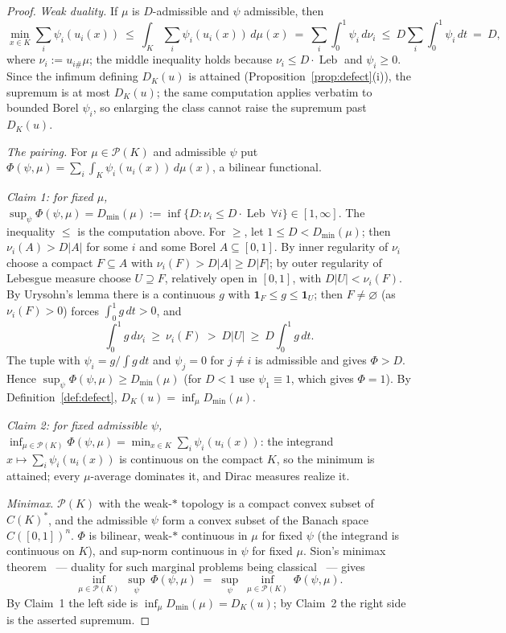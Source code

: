 \documentclass{aims}
\numberwithin{equation}{section}
\theoremstyle{plain}
\theoremstyle{definition}
\theoremstyle{remark}
\newcommand{\Leb}{\operatorname{Leb}}
\begin{document}
\begin{proof}
\emph{Weak duality.} If $\mu$ is $D$-admissible and $\psi$ admissible, then
\[
\min_{x\in K}\sum_i\psi_i(u_i(x))\ \le\
\int_K\sum_i\psi_i(u_i(x))\,d\mu(x)\ =\ \sum_i\int_0^1\psi_i\,d\nu_i\ \le\
D\sum_i\int_0^1\psi_i\,dt\ =\ D,
\]
where $\nu_i:=u_{i\#}\mu$; the middle inequality holds because
$\nu_i\le D\cdot\Leb$ and $\psi_i\ge0$. Since the infimum defining $D_K(u)$ is
attained (Proposition~\ref{prop:defect}(i)), the supremum is at most
$D_K(u)$; the same computation applies verbatim to bounded Borel $\psi_i$, so
enlarging the class cannot raise the supremum past $D_K(u)$.

\emph{The pairing.} For $\mu\in\mathcal P(K)$ and admissible $\psi$ put
$\Phi(\psi,\mu)=\sum_i\int_K\psi_i(u_i(x))\,d\mu(x)$, a bilinear functional.

\emph{Claim 1: for fixed $\mu$,}
$\sup_\psi\Phi(\psi,\mu)=D_{\min}(\mu):=\inf\{D:\nu_i\le D\cdot\Leb\ \forall
i\}\in[1,\infty]$. The inequality $\le$ is the computation above. For $\ge$,
let $1\le D<D_{\min}(\mu)$; then $\nu_i(A)>D|A|$ for some $i$ and some Borel
$A\subseteq[0,1]$. By inner regularity of $\nu_i$ choose a compact $F\subseteq
A$ with $\nu_i(F)>D|A|\ge D|F|$; by outer regularity of Lebesgue measure
choose $U\supseteq F$, relatively open in $[0,1]$, with $D|U|<\nu_i(F)$. By
Urysohn's lemma there is a continuous $g$ with
$\mathbf1_F\le g\le\mathbf1_U$; then $F\ne\varnothing$ (as $\nu_i(F)>0$)
forces $\int_0^1g\,dt>0$, and
\[
\int_0^1 g\,d\nu_i\ \ge\ \nu_i(F)\ >\ D|U|\ \ge\ D\int_0^1g\,dt .
\]
The tuple with $\psi_i=g/\int g\,dt$ and $\psi_j=0$ for $j\ne i$ is
admissible and gives $\Phi>D$. Hence $\sup_\psi\Phi(\psi,\mu)\ge D_{\min}(\mu)$
(for $D<1$ use $\psi_1\equiv1$, which gives $\Phi=1$). By
Definition~\ref{def:defect}, $D_K(u)=\inf_{\mu}D_{\min}(\mu)$.

\emph{Claim 2: for fixed admissible $\psi$,}
$\inf_{\mu\in\mathcal P(K)}\Phi(\psi,\mu)=\min_{x\in
K}\sum_i\psi_i(u_i(x))$: the integrand $x\mapsto\sum_i\psi_i(u_i(x))$ is
continuous on the compact $K$, so the minimum is attained; every
$\mu$-average dominates it, and Dirac measures realize it.

\emph{Minimax.} $\mathcal P(K)$ with the weak-$*$ topology is a compact
convex subset of $C(K)^*$, and the admissible $\psi$ form a convex subset of
the Banach space $C([0,1])^n$. $\Phi$ is bilinear, weak-$*$ continuous in
$\mu$ for fixed $\psi$ (the integrand is continuous on $K$), and sup-norm
continuous in $\psi$ for fixed $\mu$. Sion's minimax theorem~\cite{Sion58} ---
duality for such marginal problems being classical~\cite{Kellerer84} --- gives
\[
\inf_{\mu\in\mathcal P(K)}\ \sup_{\psi}\ \Phi(\psi,\mu)\;=\;
\sup_{\psi}\ \inf_{\mu\in\mathcal P(K)}\ \Phi(\psi,\mu).
\]
By Claim~1 the left side is $\inf_\mu D_{\min}(\mu)=D_K(u)$; by Claim~2 the
right side is the asserted supremum.
\end{proof}
\end{document}
